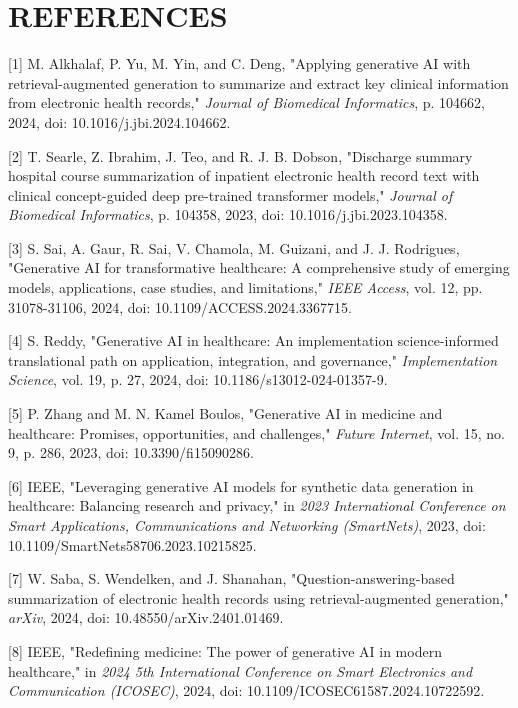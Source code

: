 \chapter*{\fontsize{16}{19}\selectfont\textbf{REFERENCES}}
\thispagestyle{plain}

[1] M. Alkhalaf, P. Yu, M. Yin, and C. Deng, "Applying generative AI with retrieval-augmented generation to summarize and extract key clinical information from electronic health records," \textit{Journal of Biomedical Informatics}, p. 104662, 2024, doi: 10.1016/j.jbi.2024.104662.

[2] T. Searle, Z. Ibrahim, J. Teo, and R. J. B. Dobson, "Discharge summary hospital course summarization of inpatient electronic health record text with clinical concept-guided deep pre-trained transformer models," \textit{Journal of Biomedical Informatics}, p. 104358, 2023, doi: 10.1016/j.jbi.2023.104358.

[3] S. Sai, A. Gaur, R. Sai, V. Chamola, M. Guizani, and J. J. Rodrigues, "Generative AI for transformative healthcare: A comprehensive study of emerging models, applications, case studies, and limitations," \textit{IEEE Access}, vol. 12, pp. 31078-31106, 2024, doi: 10.1109/ACCESS.2024.3367715.

[4] S. Reddy, "Generative AI in healthcare: An implementation science-informed translational path on application, integration, and governance," \textit{Implementation Science}, vol. 19, p. 27, 2024, doi: 10.1186/s13012-024-01357-9.

[5] P. Zhang and M. N. Kamel Boulos, "Generative AI in medicine and healthcare: Promises, opportunities, and challenges," \textit{Future Internet}, vol. 15, no. 9, p. 286, 2023, doi: 10.3390/fi15090286.

[6] IEEE, "Leveraging generative AI models for synthetic data generation in healthcare: Balancing research and privacy," in \textit{2023 International Conference on Smart Applications, Communications and Networking (SmartNets)}, 2023, doi: 10.1109/SmartNets58706.2023.10215825.

[7] W. Saba, S. Wendelken, and J. Shanahan, "Question-answering-based summarization of electronic health records using retrieval-augmented generation," \textit{arXiv}, 2024, doi: 10.48550/arXiv.2401.01469.

[8] IEEE, "Redefining medicine: The power of generative AI in modern healthcare," in \textit{2024 5th International Conference on Smart Electronics and Communication (ICOSEC)}, 2024, doi: 10.1109/ICOSEC61587.2024.10722592.

